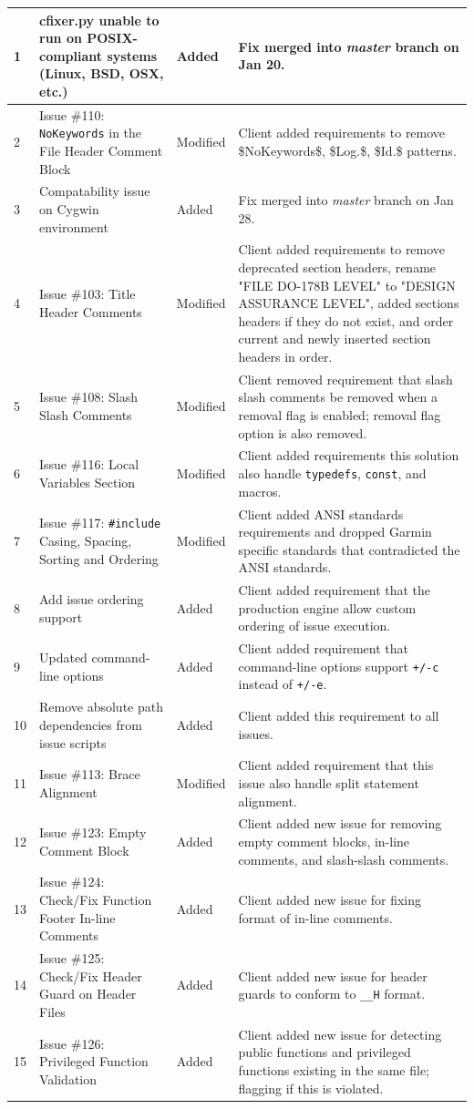 \documentclass[11pt]{scrreprt}
\begin{document}
\begin{longtable}{| p{} | p{} | p{} | p{} |}
\hline
1 & cfixer.py unable to run on POSIX-compliant systems (Linux, BSD, OSX, etc.) & Added & Fix merged into \textit{master} branch on Jan 20.\\
\hline
2 & Issue \#110: \texttt{NoKeywords} in the File Header Comment Block & Modified & Client added requirements to remove \$NoKeywords\$, \$Log.\$, \$Id.\$ patterns.\\
\hline
3 & Compatability issue on Cygwin environment & Added & Fix merged into \textit{master} branch on Jan 28.\\
\hline
4 & Issue \#103: Title Header Comments & Modified & Client added requirements to remove deprecated section headers, rename "FILE DO-178B LEVEL" to "DESIGN ASSURANCE LEVEL", added sections headers if they do not exist, and order current and newly inserted section headers in order.\\
\hline
5 & Issue \#108: Slash Slash Comments & Modified & Client removed requirement that slash slash comments be removed when a removal flag is enabled; removal flag option is also removed.\\
\hline
6 & Issue \#116: Local Variables Section & Modified & Client added requirements this solution also handle \texttt{typedefs}, \texttt{const}, and macros.\\
\hline
7 & Issue \#117: \texttt{\#include} Casing, Spacing, Sorting and Ordering & Modified & Client added ANSI standards requirements and dropped Garmin specific standards that contradicted the ANSI standards.\\
\hline
8 & Add issue ordering support & Added & Client added requirement that the production engine allow custom ordering of issue execution.\\
\hline
9 & Updated command-line options & Added & Client added requirement that command-line options support \texttt{+/-c} instead of \texttt{+/-e}.\\
\hline
10 & Remove absolute path dependencies from issue scripts & Added & Client added this requirement to all issues.\\
\hline
11 & Issue \#113: Brace Alignment & Modified & Client added requirement that this issue also handle split statement alignment.\\
\hline
12 & Issue \#123: Empty Comment Block & Added & Client added new issue for removing empty comment blocks, in-line comments, and slash-slash comments.\\
\hline
13 & Issue \#124: Check/Fix Function Footer In-line Comments & Added & Client added new issue for fixing format of in-line comments.\\
\hline
14 & Issue \#125: Check/Fix Header Guard on Header Files & Added & Client added new issue for header guards to conform to \texttt{\_<all caps filename>\_H} format.\\
\hline
15 & Issue \#126: Privileged Function Validation & Added & Client added new issue for detecting public functions and privileged functions existing in the same file; flagging if this is violated.\\
\hline
\end{longtable}
\end{document}
